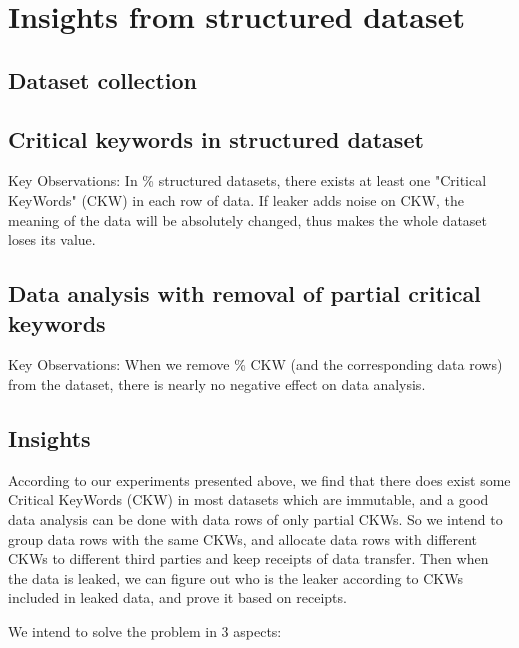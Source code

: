 \section{Insights from structured dataset}

\subsection{Dataset collection}

\subsection{Critical keywords in structured dataset}


Key Observations: In \fillme\% structured datasets, there exists at least one "Critical KeyWords" (CKW) in each row of data. If leaker adds noise on CKW, the meaning of the data will be absolutely changed, thus makes the whole dataset loses its value.

\subsection{Data analysis with removal of partial critical keywords}


Key Observations: When we remove \fillme\% CKW (and the corresponding data rows) from the dataset, there is nearly no negative effect on data analysis. 

\subsection{Insights}

According to our experiments presented above, we find that there does exist some Critical KeyWords (CKW) in most datasets which are immutable, and a good data analysis can be done with data rows of only partial CKWs. So we intend to group data rows with the same CKWs, and allocate data rows with different CKWs to different third parties and keep receipts of data transfer. Then when the data is leaked, we can figure out who is the leaker according to CKWs included in leaked data, and prove it based on receipts.

We intend to solve the problem in 3 aspects:

